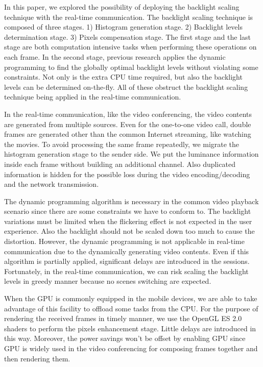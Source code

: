 In this paper, we explored the possibility of deploying the backlight
scaling technique with the real-time communication. The backlight
scaling technique is composed of three stages. 1) Histogram generation
stage. 2) Backlight levels determination stage. 3) Pixels compensation
stage. The first stage and the last stage are both computation
intensive tasks when performing these operations on each frame. In the
second stage, previous research applies the dynamic programming to
find the globally optimal backlight levels without violating some
constraints. Not only is the extra CPU time required, but also the
backlight levels can be determined on-the-fly. All of these obstruct
the backlight scaling technique being applied in the real-time
communication.

In the real-time communication, like the video conferencing, the video
contents are generated from multiple sources. Even for the one-to-one
video call, double frames are generated other than the common Internet
streaming, like watching the movies. To avoid processing the same
frame repeatedly, we migrate the histogram generation stage to the
sender side. We put the luminance information inside each frame
without building an additional channel. Also duplicated information is
hidden for the possible loss during the video encoding/decoding and
the network transmission.

The dynamic programming algorithm is necessary in the common video
playback scenario since there are some constraints we have to conform
to. The backlight variations must be limited when the flickering
effect is not expected in the user experience. Also the backlight
should not be scaled down too much to cause the distortion. However,
the dynamic programming is not applicable in real-time communication
due to the dynamically generating video contents. Even if this
algorithm is partially applied, significant delays are introduced in
the sessions. Fortunately, in the real-time communication, we can risk
scaling the backlight levels in greedy manner because no scenes
switching are expected. 

When the GPU is commonly equipped in the mobile devices, we are able
to take advantage of this facility to offload some tasks from the
CPU. For the purpose of rendering the received frames in timely
manner, we use the OpenGL ES 2.0 shaders to perform the pixels
enhancement stage. Little delays are introduced in this way. Moreover,
the power savings won't be offset by enabling GPU since GPU is widely
used in the video conferencing for composing frames together and then
rendering them.

